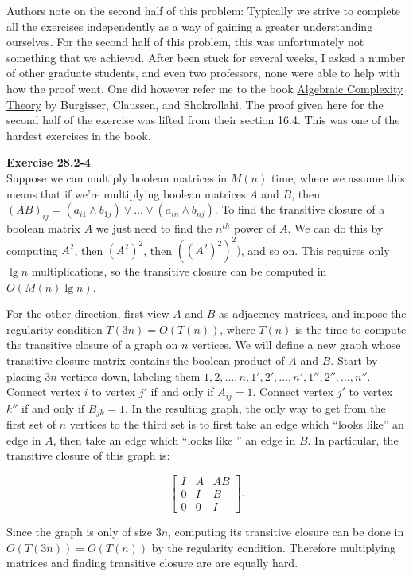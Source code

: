 \documentclass{article}
\begin{document}
Authors note on the second half of this problem: Typically we strive to complete all the exercises independently as a way of gaining a greater understanding ourselves. For the second half of this problem, this was unfortunately not something that we achieved. After been stuck for several weeks, I asked a number of other graduate students, and even two professors, none were able to help with how the proof went. One did however refer me to the book \underline{Algebraic Complexity Theory} by Burgisser, Claussen, and Shokrollahi. The proof given here for the second half of the exercise was lifted from their section 16.4. This was one of the hardest exercises in the book.

\noindent\textbf{Exercise 28.2-4}\\

Suppose we can multiply boolean matrices in $M(n)$ time, where we assume this means that if we're multiplying boolean matrices $A$ and $B$, then $(AB)_{ij} = (a_{i1}\wedge b_{1j}) \vee \ldots \vee (a_{in} \wedge b_{nj})$.  To find the transitive closure of a boolean matrix $A$ we just need to find the $n^{th}$ power of $A$.  We can do this by computing $A^2$, then $(A^2)^2$, then $((A^2)^2)^2)$, and so on.  This requires only $\lg n$ multiplications, so the transitive closure can be computed in $O(M(n)\lg n)$.  

For the other direction, first view $A$ and $B$ as adjacency matrices, and impose the regularity condition $T(3n) = O(T(n))$, where $T(n)$ is the time to compute the transitive closure of a graph on $n$ vertices.  We will define a new graph whose transitive closure matrix contains the boolean product of $A$ and $B$.  Start by placing $3n$ vertices down, labeling them $1,2,\ldots, n, 1', 2', \ldots, n', 1'', 2'', \ldots, n''$.  Connect vertex $i$ to vertex $j'$ if and only if $A_{ij} = 1$.  Connect vertex $j'$ to vertex $k''$ if and only if $B_{jk} = 1$. In the resulting graph, the only way to get from the first set of $n$ vertices to the third set is to first take an edge which ``looks like'' an edge in $A$, then take an edge which ``looks like '' an edge in $B$. In particular, the transitive closure of this graph is:

\[ \left[ \begin{array}{ccc} I & A & AB \\ 0 & I & B \\ 0 & 0 & I \end{array} \right].\]

Since the graph is only of size $3n$, computing its transitive closure can be done in $O(T(3n)) = O(T(n))$ by the regularity condition.  Therefore multiplying matrices and finding transitive closure are are equally hard. \\
\end{document}
